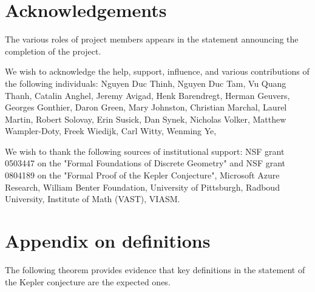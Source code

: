 \section{Acknowledgements}

The various roles of project members appears in the statement announcing the completion of the project.

We wish to acknowledge the help, support, influence, and various contributions of the following individuals:
Nguyen Duc Thinh,  
Nguyen Duc Tam, 
Vu Quang Thanh,
% 
Catalin Anghel, 
Jeremy Avigad, 
Henk Barendregt,
%
Herman Geuvers,
Georges Gonthier,
Daron Green,
Mary Johnston,
Christian Marchal,
Laurel %
Martin, 
%
Robert Solovay,
Erin Susick,
Dan Synek,
Nicholas Volker, 
Matthew Wampler-Doty, 
Freek Wiedijk, 
Carl Witty,
Wenming Ye,

We wish to thank the following sources of institutional support:
NSF grant 0503447 on the "Formal Foundations of Discrete Geometry" and NSF grant 0804189 on the "Formal Proof of the Kepler Conjecture", 
Microsoft Azure Research, William Benter Foundation, University of Pittsburgh, Radboud University, Institute of Math (VAST), VIASM.


\newpage
\section{Appendix on definitions}

The following theorem provides evidence that key definitions in the statement of the Kepler conjecture
are the expected ones.

